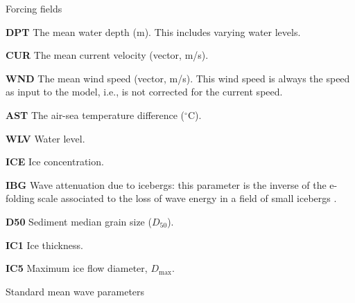 \begin{list}{)\hfill}
            { \leftmargin 7mm 
             \rightmargin 0mm \itemsep \baselineskip \parsep 0mm}

\item {Forcing fields}

\begin{list}{)\hfill}
            { \leftmargin 8mm 
             \rightmargin 0mm \itemsep 0mm \parsep 0mm}
\item \textbf{DPT} The mean water depth (m). This includes varying water levels. 
\item \textbf{CUR} The mean current velocity (vector, m/s).
\item \textbf{WND} The mean wind speed (vector, m/s). This wind speed is always the
      speed as input to the model, i.e., is not corrected for the current
      speed.
\item \textbf{AST} The air-sea temperature difference ($^\circ$C).
\item \textbf{WLV} Water level.
\item \textbf{ICE} Ice concentration.
\item \textbf{IBG} Wave attenuation due to icebergs: this parameter is the inverse of the
  e-folding scale associated to the loss of wave energy in a field of small
  icebergs \citep{art:Aea11}.
\item \textbf{D50} Sediment median grain size ($D_{50}$). 
\item \textbf{IC1} Ice thickness. 
\item \textbf{IC5} Maximum ice flow diameter, $D_{\max}$. 
\end{list}

\item{Standard mean wave parameters}


\end{list}

